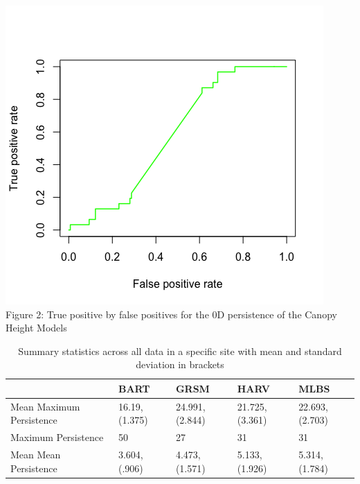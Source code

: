 \documentclass[10pt]{article}
\begin{document}
\noindent \includegraphics[scale= 0.5]{AUC1d}\\
Figure 2: True positive by false positives for the 0D persistence of the Canopy Height Models

\begin{table}[]
\centering
\caption{Summary statistics across all data in a specific site with mean and standard deviation in brackets}
\begin{tabular}{|l|l|l|l|l|}
\hline
                         & BART          & GRSM          & HARV          & MLBS          \\ \hline
Mean Maximum Persistence & 16.19,(1.375) & 24.991,(2.844) & 21.725,(3.361) & 22.693,(2.703)  \\ \hline
Maximum Persistence      &50            & 27            & 31            & 31            \\ \hline
Mean Mean Persistence    & 3.604,(.906) & 4.473,(1.571) & 5.133,(1.926) & 5.314,(1.784) \\ \hline
\end{tabular}
\end{table}
\end{document}
